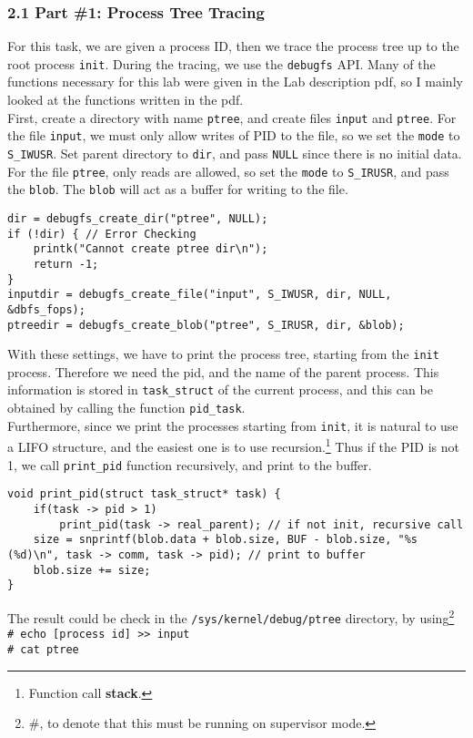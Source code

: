 \documentclass[12pt]{report}
\begin{document}
\subsubsection*{2.1 Part \#1: Process Tree Tracing}
For this task, we are given a process ID, then we trace the process tree up to the root process \texttt{init}. During the tracing, we use the \texttt{debugfs} API. Many of the functions necessary for this lab were given in the Lab description pdf, so I mainly looked at the functions written in the pdf.\\
First, create a directory with name \texttt{ptree}, and create files \texttt{input} and \texttt{ptree}. For the file \texttt{input}, we must only allow writes of PID to the file, so we set the \texttt{mode} to \texttt{S\_IWUSR}. Set parent directory to \texttt{dir}, and pass \texttt{NULL} since there is no initial data. For the file \texttt{ptree}, only reads are allowed, so set the \texttt{mode} to \texttt{S\_IRUSR}, and pass the \texttt{blob}. The \texttt{blob} will act as a buffer for writing to the file.
\begin{lstlisting}[style=Cstyle]
dir = debugfs_create_dir("ptree", NULL);
if (!dir) { // Error Checking
	printk("Cannot create ptree dir\n");
	return -1;
}
inputdir = debugfs_create_file("input", S_IWUSR, dir, NULL, &dbfs_fops);
ptreedir = debugfs_create_blob("ptree", S_IRUSR, dir, &blob);
\end{lstlisting}
With these settings, we have to print the process tree, starting from the \texttt{init} process. Therefore we need the pid, and the name of the parent process. This information is stored in \texttt{task\_struct} of the current process, and this can be obtained by calling the function \texttt{pid\_task}.\\
Furthermore, since we print the processes starting from \texttt{init}, it is natural to use a LIFO structure, and the easiest one is to use recursion.\footnote{Function call \textbf{stack}.} Thus if the PID is not 1, we call \texttt{print\_pid} function recursively, and print to the buffer.
\begin{lstlisting}[style=Cstyle]
void print_pid(struct task_struct* task) {
	if(task -> pid > 1) 
		print_pid(task -> real_parent); // if not init, recursive call
	size = snprintf(blob.data + blob.size, BUF - blob.size, "%s (%d)\n", task -> comm, task -> pid); // print to buffer
	blob.size += size;
}
\end{lstlisting}
The result could be check in the \texttt{/sys/kernel/debug/ptree} directory, by using\footnote{\#, to denote that this must be running on supervisor mode.}\\
\texttt{\# echo [process id] >> input\\
\# cat ptree}
\end{document}
